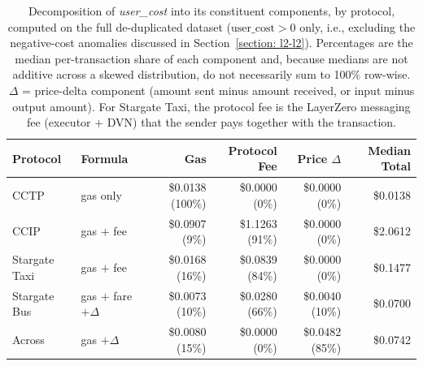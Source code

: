 \begin{table}[ht]
\caption{Decomposition of \emph{user\_cost} into its constituent components, by protocol, computed on the full de-duplicated dataset ($\text{user\_cost} > 0$ only, i.e., excluding the negative-cost anomalies discussed in Section~\ref{section: l2-l2}). Percentages are the median per-transaction share of each component and, because medians are not additive across a skewed distribution, do not necessarily sum to 100\% row-wise. $\Delta$ = price-delta component (amount sent minus amount received, or input minus output amount). For Stargate Taxi, the protocol fee is the LayerZero messaging fee (executor $+$ DVN) that the sender pays together with the transaction.}
\label{table:cost_decomposition}
\begingroup
\scriptsize
\setlength{\tabcolsep}{3pt}
\begin{tabular}{llrrrr}
\toprule
\textbf{Protocol} & \textbf{Formula} & \textbf{Gas} & \textbf{Protocol Fee} & \textbf{Price $\Delta$} & \textbf{Median Total} \\
\midrule
CCTP & gas only & \$0.0138 (100\%) & \$0.0000 (0\%) & \$0.0000 (0\%) & \$0.0138 \\
CCIP & gas $+$ fee & \$0.0907 (9\%) & \$1.1263 (91\%) & \$0.0000 (0\%) & \$2.0612 \\
Stargate Taxi & gas $+$ fee & \$0.0168 (16\%) & \$0.0839 (84\%) & \$0.0000 (0\%) & \$0.1477 \\
Stargate Bus & gas $+$ fare $+\Delta$ & \$0.0073 (10\%) & \$0.0280 (66\%) & \$0.0040 (10\%) & \$0.0700 \\
Across & gas $+\Delta$ & \$0.0080 (15\%) & \$0.0000 (0\%) & \$0.0482 (85\%) & \$0.0742 \\
\bottomrule
\end{tabular}
\endgroup
\end{table}

